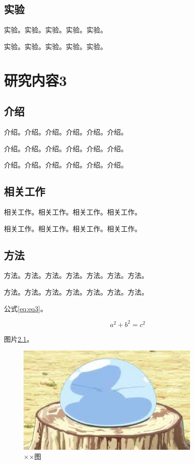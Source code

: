 \documentclass{csuthesis}
\begin{document}
    \section{实验}
    实验。实验。实验。实验。实验。

    实验。实验。实验。实验。实验。

    \chapter{研究内容3}
    \thispagestyle{mainstyle} %
    \section{介绍}
    介绍。介绍。介绍。介绍。介绍。介绍。

    介绍。介绍。介绍。介绍。介绍。介绍。

    介绍。介绍。介绍。介绍。介绍。介绍。

    \section{相关工作}
    相关工作。相关工作。相关工作。相关工作。

    相关工作。相关工作。相关工作。相关工作。

    \section{方法}
    方法。方法。方法。方法。方法。方法。方法。

    方法。方法。方法。方法。方法。方法。方法。

    公式\ref{eq:eq3}。

    \begin{equation}
        a^2 + b^2 = c^2 \label{eq:eq3}
    \end{equation}

    图片\ref{fig:image3}。
    \begin{figure}
        \centering
        \includegraphics[width=0.8\textwidth]{images/image.jpeg}
        \caption{××图}
        \label{fig:image3}
    \end{figure}
\end{document}
